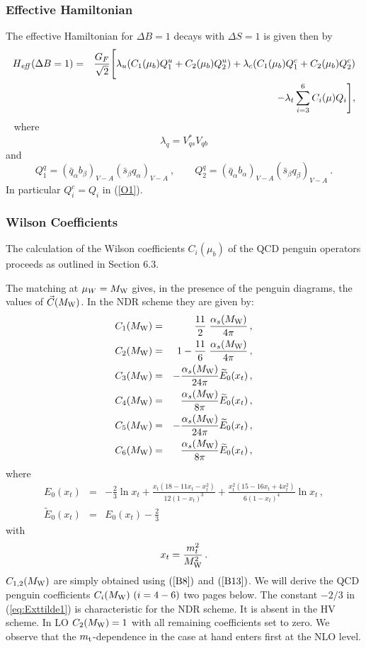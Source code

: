 \documentclass[12pt]{article}
\def\as{\alpha_s}
\newcommand{\mt}{m_{\rm t}}
\newcommand{\mw}{M_{\rm W}}
\newcommand{\be}{\begin{equation}}
\newcommand{\ee}{\end{equation}}
\begin{document}
\begin{itemize}
\begin{itemize}
\subsubsection{Effective Hamiltonian}
The effective Hamiltonian for $\Delta B=1$ decays with
$\Delta S=1$ is given then by
\begin{eqnarray}\label{HB4} 
H_{\it eff}(\Delta B=1) &=&
\frac{G_F}{\sqrt{2}} \Bigg[ \lambda_u(C_1(\mu_b) 
Q^u_1+C_2(\mu_b)Q^u_2) 
+\lambda_c( C_1(\mu_b) Q^c_1+C_2(\mu_b)Q^c_2)
\nonumber\\  
&& -\lambda_t \sum_{i=3}^6 C_i(\mu)Q_i \Bigg] ,
\end{eqnarray}~ 
where
\be\label{lb}
\lambda_q=V_{qs}^{*}V_{qb}
\ee
and
\be\label{Qq}
Q_1^q=(\bar q_\alpha b_\beta)_{V-A}(\bar s_\beta q_\alpha)_{V-A}~,
\quad\quad
Q_2^q=(\bar q_\alpha b_\alpha)_{V-A}(\bar s_\beta q_\beta)_{V-A}~.
\ee
In particular $Q_i^c=Q_i$ in (\ref{O1}).
\subsubsection{Wilson Coefficients}
The calculation of the Wilson coefficients $C_i(\mu_b)$ of
the QCD penguin operators proceeds as outlined in Section 6.3.

The matching at $\mu_W=\mw$ gives, in the presence of the penguin 
diagrams, the values of $\vec C(\mw)$. In the NDR scheme they 
are given by:
\begin{eqnarray}
C_1(\mw) &=&     \frac{11}{2} \; \frac{\as(\mw)}{4\pi} \, ,
\label{eq:CMw1QCD} \\
C_2(\mw) &=& 1 - \frac{11}{6} \; \frac{\as(\mw)}{4\pi} \, ,
\label{eq:CMw2QCD} \\
C_3(\mw) &=& -\frac{\as(\mw)}{24\pi} \widetilde{E}_0(x_t) \, ,
\label{eq:CMw3QCD} \\
C_4(\mw) &=& \frac{\as(\mw)}{8\pi} \widetilde{E}_0(x_t) \, ,
\label{eq:CMw4QCD} \\
C_5(\mw) &=& -\frac{\as(\mw)}{24\pi} \widetilde{E}_0(x_t) \, ,
\label{eq:CMw5QCD} \\
C_6(\mw) &=& \frac{\as(\mw)}{8\pi} \widetilde{E}_0(x_t) \, ,
\label{eq:CMw6QCD}
\end{eqnarray}
where
\begin{eqnarray}
E_0(x_t) &=& 
-\frac{2}{3} \ln x_t + \frac{x_t (18 -11 x_t - x_t^2)}{12 (1-x_t)^3} +
          \frac{x_t^2 (15 - 16 x_t  + 4 x_t^2)}{6 (1-x_t)^4} \ln x_t \, ,
\label{eq:Ext1} \\
\widetilde{E}_0(x_t) &=& E_0(x_t) - \frac{2}{3}
\label{eq:Exttilde1}
\end{eqnarray}
with
\begin{equation}
x_t = \frac{m_t^2}{\mw^2} \, .
\label{eq:xt}
\end{equation}
$C_{1,2}(\mw)$ are simply obtained using $(\ref{B8})$ and $(\ref{B13})$.
We will derive the QCD penguin coefficients $C_i(\mw)~(i=4-6)$
two pages below. The constant $-2/3$ in (\ref{eq:Exttilde1})
is characteristic for the NDR scheme. It is absent in the HV scheme.
In LO $C_2(\mw)=1$ with all remaining coefficients set to zero.
We observe that the $\mt$-dependence in the case at hand enters
first at the NLO level.


\end{itemize}
\end{itemize}
\end{document}
